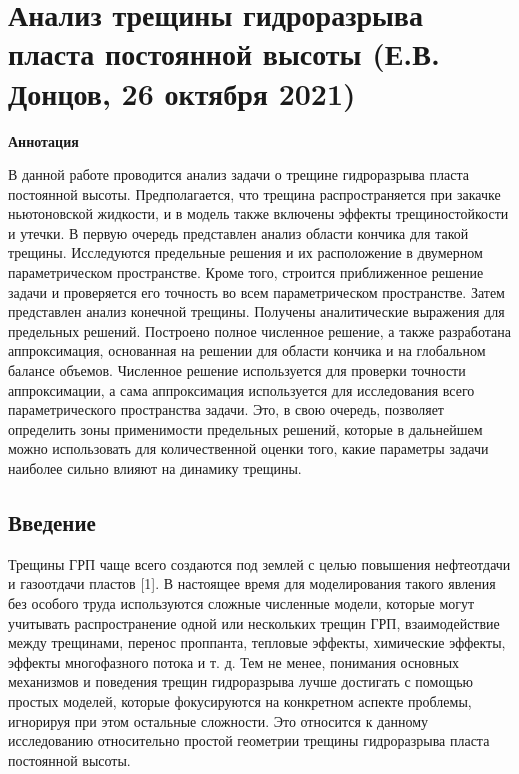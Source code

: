 \documentclass[main.tex]{subfiles}
\begin{document}

\section*{Анализ трещины гидроразрыва пласта постоянной высоты (Е.В. Донцов, 26 октября 2021)}

\textbf{Аннотация}

В данной работе проводится анализ задачи о трещине гидроразрыва пласта постоянной высоты.
Предполагается, что трещина распространяется при закачке ньютоновской жидкости, и в модель также включены эффекты трещиностойкости и утечки.
В первую очередь представлен анализ области кончика для такой трещины.
Исследуются предельные решения и их расположение в двумерном параметрическом пространстве.
Кроме того, строится приближенное решение задачи и проверяется его точность во всем параметрическом пространстве.
Затем представлен анализ конечной трещины.
Получены аналитические выражения для предельных решений.
Построено полное численное решение, а также разработана аппроксимация, основанная на решении для области кончика и на глобальном балансе объемов.
Численное решение используется для проверки точности аппроксимации, а сама аппроксимация используется для исследования всего параметрического пространства задачи.
Это, в свою очередь, позволяет определить зоны применимости предельных решений, которые в дальнейшем можно использовать для количественной оценки того, какие параметры задачи наиболее сильно влияют на динамику трещины.

\subsection{Введение}

Трещины ГРП чаще всего создаются под землей с целью повышения нефтеотдачи и газоотдачи пластов [1].
В настоящее время для моделирования такого явления без особого труда используются сложные численные модели, которые могут учитывать распространение одной или нескольких трещин ГРП, взаимодействие между трещинами, перенос проппанта, тепловые эффекты, химические эффекты, эффекты многофазного потока и т. д.
Тем не менее, понимания основных механизмов и поведения трещин гидроразрыва лучше достигать с помощью простых моделей, которые фокусируются на конкретном аспекте проблемы, игнорируя при этом остальные сложности.
Это относится к данному исследованию относительно простой геометрии трещины гидроразрыва пласта постоянной высоты.
\end{document}
